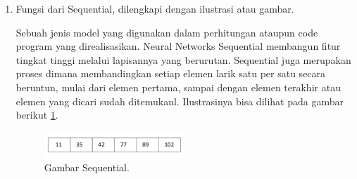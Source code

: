\begin{enumerate}
\item Fungsi dari Sequential, dilengkapi dengan ilustrasi atau gambar.
\par Sebuah jenis model yang digunakan dalam perhitungan ataupun code program yang direalisasikan. Neural Networks Sequential membangun fitur tingkat tinggi melalui lapisannya yang berurutan. Sequential juga merupakan proses dimana membandingkan setiap elemen larik satu per satu secara beruntun, mulai dari elemen pertama, sampai dengan elemen terakhir atau elemen yang dicari sudah ditemukanl.  Ilustrasinya bisa dilihat pada gambar berikut  \ref{no8}.
	\begin{figure}[ht]
	\centerline{\includegraphics[width=0.5\textwidth]{figures/chapter6/no8.png}}
	\caption{Gambar Sequential.}
	\label{no8}
	\end{figure}
\end{enumerate}



